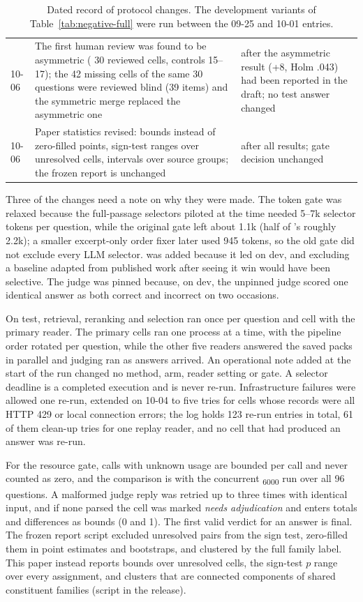 \begin{table}[t]
\begin{tabularx}{\textwidth}{@{}p{1.6cm}Xp{5.4cm}@{}}
10-06 & The first human review was found to be asymmetric (\lexb{} 30 reviewed cells, controls 15--17); the 42 missing cells of the same 30 questions were reviewed blind (39 items) and the symmetric merge replaced the asymmetric one & after the asymmetric result (+8, Holm .043) had been reported in the draft; no test answer changed \\
10-06 & Paper statistics revised: bounds instead of zero-filled points, sign-test ranges over unresolved cells, intervals over source groups; the frozen report is unchanged & after all results; gate decision unchanged \\
\bottomrule
\end{tabularx}
\caption{Dated record of protocol changes. The development variants of Table~\ref{tab:negative-full} were run between the 09-25 and 10-01 entries.}
\label{tab:timeline}
\end{table}

Three of the changes need a note on why they were made. The token gate was relaxed because the full-passage selectors piloted at the time needed 5--7k selector tokens per question, while the original gate left about 1.1k (half of \hybrid's roughly 2.2k); a smaller excerpt-only order fixer later used 945 tokens, so the old gate did not exclude every LLM selector. \setr{} was added because it led on dev, and excluding a baseline adapted from published work after seeing it win would have been selective. The judge was pinned because, on dev, the unpinned judge scored one identical answer as both correct and incorrect on two occasions.

On test, retrieval, reranking and selection ran once per question and cell with the primary reader. The primary cells ran one process at a time, with the pipeline order rotated per question, while the other five readers answered the saved packs in parallel and judging ran as answers arrived. An operational note added at the start of the run changed no method, arm, reader setting or gate. A selector deadline is a completed execution and is never re-run. Infrastructure failures were allowed one re-run, extended on 10-04 to five tries for cells whose records were all HTTP 429 or local connection errors; the log holds 123 re-run entries in total, 61 of them clean-up tries for one replay reader, and no cell that had produced an answer was re-run.

For the resource gate, calls with unknown usage are bounded per call and never counted as zero, and the comparison is with the concurrent \hybrid\textsubscript{6000} run over all 96 questions. A malformed judge reply was retried up to three times with identical input, and if none parsed the cell was marked \emph{needs adjudication} and enters totals and differences as bounds (0 and 1). The first valid verdict for an answer is final. The frozen report script excluded unresolved pairs from the sign test, zero-filled them in point estimates and bootstraps, and clustered by the full family label. This paper instead reports bounds over unresolved cells, the sign-test $p$ range over every assignment, and clusters that are connected components of shared constituent families (script in the release).
